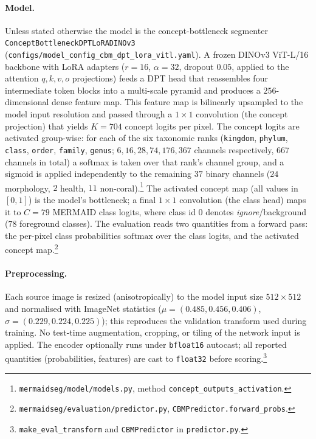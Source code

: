 \paragraph{Model.}
Unless stated otherwise the model is the concept-bottleneck segmenter
\texttt{ConceptBottleneckDPTLoRADINOv3}
(\texttt{configs/model\_config\_cbm\_dpt\_lora\_vitl.yaml}). A frozen DINOv3
ViT-L/16 backbone with LoRA adapters ($r=16$, $\alpha=32$, dropout $0.05$, applied
to the attention $q,k,v,o$ projections) feeds a DPT head that reassembles four
intermediate token blocks into a multi-scale pyramid and produces a
$256$-dimensional dense feature map. This feature map is bilinearly upsampled to
the model input resolution and passed through a $1{\times}1$ convolution (the
concept projection) that yields $K=704$ concept logits per pixel. The concept
logits are activated group-wise: for each of the six taxonomic ranks
(\texttt{kingdom}, \texttt{phylum}, \texttt{class}, \texttt{order},
\texttt{family}, \texttt{genus}; $6,16,28,74,176,367$ channels respectively,
$667$ channels in total) a softmax is taken over that rank's channel group, and a
sigmoid is applied independently to the remaining $37$ binary channels ($24$
morphology, $2$ health, $11$ non-coral).\footnote{%
\texttt{mermaidseg/model/models.py}, method \texttt{concept\_outputs\_activation}.}
The activated concept map (all values in $[0,1]$) is the model's bottleneck; a
final $1{\times}1$ convolution (the class head) maps it to $C=79$ MERMAID class
logits, where class id $0$ denotes \emph{ignore}/background ($78$ foreground
classes). The evaluation reads two quantities from a forward pass: the
per-pixel class probabilities $\mathrm{softmax}$ over the class logits, and the
activated concept map.\footnote{%
\texttt{mermaidseg/evaluation/predictor.py}, \texttt{CBMPredictor.forward\_probs}.}

\paragraph{Preprocessing.}
Each source image is resized (anisotropically) to the model input size
$512\times512$ and normalised with ImageNet statistics
($\mu=(0.485,0.456,0.406)$, $\sigma=(0.229,0.224,0.225)$); this reproduces the
validation transform used during training. No test-time augmentation, cropping,
or tiling of the network input is applied. The encoder optionally runs under
\texttt{bfloat16} autocast; all reported quantities (probabilities, features)
are cast to \texttt{float32} before scoring.\footnote{%
\texttt{make\_eval\_transform} and \texttt{CBMPredictor} in
\texttt{predictor.py}.}

